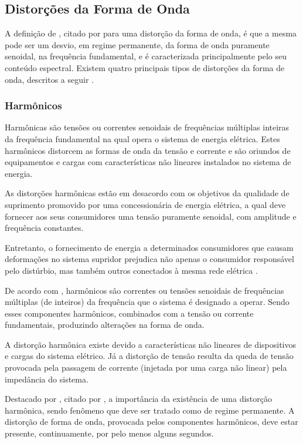 \subsection{Distorções da Forma de Onda}
\par 
A definição de \cite{OLIVE}, citado por \cite{DEL03} para uma distorção da forma de onda, é que a mesma pode ser um desvio, em regime permanente, da forma de onda puramente senoidal, na frequência fundamental, e é caracterizada principalmente pelo seu conteúdo espectral. Existem quatro principais tipos de distorções da forma de onda, descritos a seguir \cite{DUG96}.
\subsubsection{Harmônicos}
\par
Harmônicas são tensões ou correntes senoidais de frequências múltiplas inteiras da frequência fundamental na qual opera o sistema de energia elétrica. Estes harmônicos distorcem as formas de onda da tensão e corrente e são oriundos de equipamentos e cargas com características não lineares instalados no sistema de energia. 
\par
As distorções harmônicas estão em desacordo com os objetivos da qualidade de suprimento promovido por uma concessionária de energia elétrica, a qual deve fornecer aos seus consumidores uma tensão puramente senoidal, com amplitude e frequência constantes. \par
\par
Entretanto, o fornecimento de energia a determinados consumidores que causam deformações no sistema supridor prejudica não apenas o consumidor responsável pelo distúrbio, mas também outros conectados à mesma rede elétrica \cite{DEL03}.
\par
De acordo com \cite{FER99}, harmônicos são correntes ou tensões senoidais de frequências múltiplas (de inteiros) da frequência que o sistema é designado a operar. Sendo esses componentes harmônicos, combinados com a tensão ou corrente fundamentais, produzindo alterações na forma de onda. 
\par
A distorção harmônica existe devido a características não lineares de dispositivos e cargas do sistema elétrico. Já a distorção de tensão resulta da queda de tensão provocada pela passagem de corrente (injetada por uma carga não linear) pela impedância do sistema.
\par
Destacado por \cite{DUG96}, citado por \cite{FER99}, a importância da existência de uma distorção harmônica, sendo fenômeno que deve ser tratado como de regime permanente. A distorção de forma de onda, provocada pelos componentes harmônicos, deve estar presente, continuamente, por pelo menos alguns segundos.


